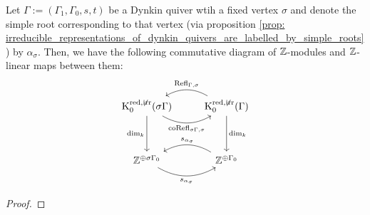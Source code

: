             \begin{proposition} \label{prop: (co)reflection_functors_as_simple_reflections}
                Let $\Gamma := (\Gamma_1, \Gamma_0, s, t)$ be a Dynkin quiver wtih a fixed vertex $\sigma$ and denote the simple root corresponding to that vertex (via proposition \ref{prop: irreducible_representations_of_dynkin_quivers_are_labelled_by_simple_roots}) by $\alpha_{\sigma}$. Then, we have the following commutative diagram of $\mathbb{Z}$-modules and $\mathbb{Z}$-linear maps between them:
                    $$
                        \begin{tikzcd}
                        	{\K_0^{\red, \not \irr}(\sigma\Gamma)} & {\K_0^{\red, \not \irr}(\Gamma)} \\
                        	\\
                        	{\Z^{\oplus \sigma\Gamma_0}} & {\Z^{\oplus \Gamma_0}}
                        	\arrow["{\dim_k}"', from=1-1, to=3-1]
                        	\arrow["{s_{\alpha_{\sigma}}}"', bend right, from=3-2, to=3-1]
                        	\arrow["{\Refl_{\Gamma, \sigma}}"', bend right, from=1-2, to=1-1]
                        	\arrow["{\dim_k}", from=1-2, to=3-2]
                        	\arrow["{\co\Refl_{\sigma \Gamma, \sigma}}"', bend right, from=1-1, to=1-2]
                        	\arrow["{s_{\alpha_{\sigma}}}"', bend right, from=3-1, to=3-2]
                        \end{tikzcd}
                    $$
            \end{proposition}
                \begin{proof}
                    
                \end{proof}
            
